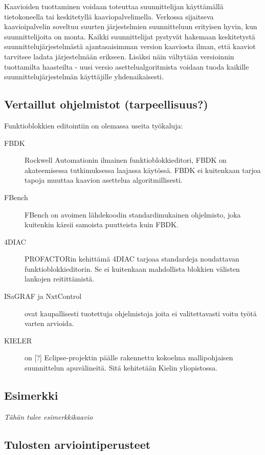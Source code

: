 \documentclass[finnish,12pt]{article}
\begin{document}
Kaavioiden tuottaminen voidaan toteuttaa suunnittelijan käyttämällä tietokoneella tai keskitetyllä kaaviopalvelimella.
Verkossa sijaitseva kaavioipalvelin soveltuu suurten järjestelmien suunnitteluun erityisen hyvin, kun suunnittelijoita on monta. Kaikki suunnittelijat pystyvät hakemaan keskitetystä suunnittelujärjestelmästä ajantasaisimman version kaaviosta ilman, että kaaviot tarvitsee ladata järjestelmään erikseen.
Lisäksi näin vältytään versioinnin tuottamilta haasteilta - uusi versio asettelualgoritmista voidaan tuoda kaikille suunnittelujärjestelmän käyttäjille yhdenaikaisesti.

		\subsection{Vertaillut ohjelmistot (tarpeellisuus?) }

Funktioblokkien editointiin on olemassa useita työkaluja:

\begin{description}
	\item[FBDK] Rockwell Automationin ilmainen funktioblokkieditori, FBDK on akateemisessa tutkimuksessa laajassa käytössä. FBDK ei kuitenkaan tarjoa tapoja muuttaa kaavion asettelua algoritmillisesti.
	\item[FBench] FBench on avoimen lähdekoodin standardimukainen ohjelmisto, joka kuitenkin kärsii samoista puutteista kuin FBDK.
	\item[4DIAC] PROFACTORin kehittämä 4DIAC tarjoaa standardeja noudattavan funktioblokkieditorin. Se ei kuitenkaan mahdollista blokkien välisten lankojen reitittämistä. 
	\item[ISaGRAF ja NxtControl] ovat kaupallisesti tuotettuja ohjelmistoja joita ei valitettavasti voitu työtä varten arvioida.
	\item[KIELER] on [?] Eclipse-projektin päälle rakennettu kokoelma mallipohjaisen suunnittelun apuvälineitä. Sitä kehitetään Kielin yliopistossa.
\end{description}

		\subsection{Esimerkki}
			\emph{Tähän tulee esimerkkikaavio}

		\subsection{Tulosten arviointiperusteet}
\end{document}
